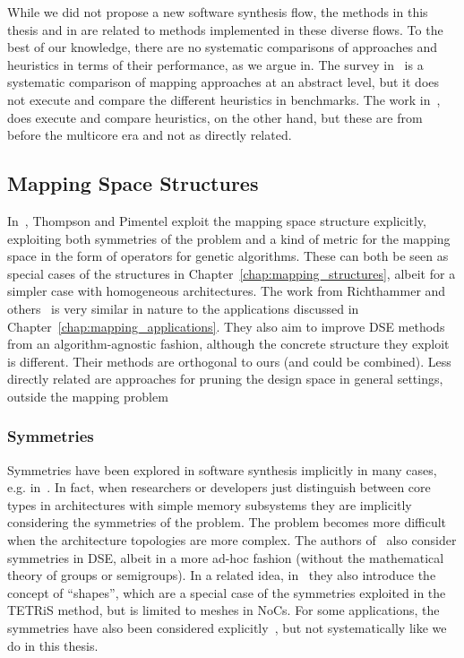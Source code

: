 While we did not propose a new software synthesis flow, the methods in this thesis and in \mocasin are related to methods implemented in these diverse flows.
To the best of our knowledge, there are no systematic comparisons of approaches and heuristics in terms of their performance, as we argue in\cite{goens_mcsoc16}.
The survey in~\cite{singh2013mapping} is a systematic comparison of mapping approaches at an abstract level, but it does not execute and compare the different heuristics in benchmarks.
The work in~\cite{braun2001comparison}, does execute and compare heuristics, on the other hand, but these are from before the multicore era and not as directly related.

\subsection{Mapping Space Structures}

In~\cite{thompson2013exploiting}, Thompson and Pimentel exploit the mapping space structure explicitly, exploiting both symmetries of the problem and a kind of metric for the mapping space in the form of operators for genetic algorithms.
These can both be seen as special cases of the structures in Chapter~\ref{chap:mapping_structures}, albeit for a simpler case with homogeneous architectures.
The work from Richthammer and others~\cite{richthammer2018search,richthammer_todaes20} is very similar in nature to the applications discussed in Chapter~\ref{chap:mapping_applications}.
They also aim to improve \ac{DSE} methods from an algorithm-agnostic fashion, although the concrete structure they exploit is different.
Their methods are orthogonal to ours (and could be combined).
Less directly related are approaches for pruning the design space in general settings, outside the mapping problem~\cite{wang2004design}


\subsubsection{Symmetries}

Symmetries have been explored in software synthesis implicitly in many cases, e.g. in~\cite{hannig2001design,kreutz2005design,singh2010communication,roloff2015execution}.
In fact, when researchers or developers just distinguish between core types in architectures with simple memory subsystems they are implicitly considering the symmetries of the problem.
The problem becomes more difficult when the architecture topologies are more complex.
The authors of~\cite{schwarzer2017symmetry} also consider symmetries in \ac{DSE}, albeit in a more ad-hoc fashion (without the mathematical theory of groups or semigroups).
In a related idea, in~\cite{shapes} they also introduce the concept of ``shapes'', which are a special case of the symmetries exploited in the \ac{TETRiS} method, but is limited to meshes in \acp{NoC}.
For some applications, the symmetries have also been considered explicitly~\cite{cohen1988symmetry}, but not systematically like we do in this thesis.

